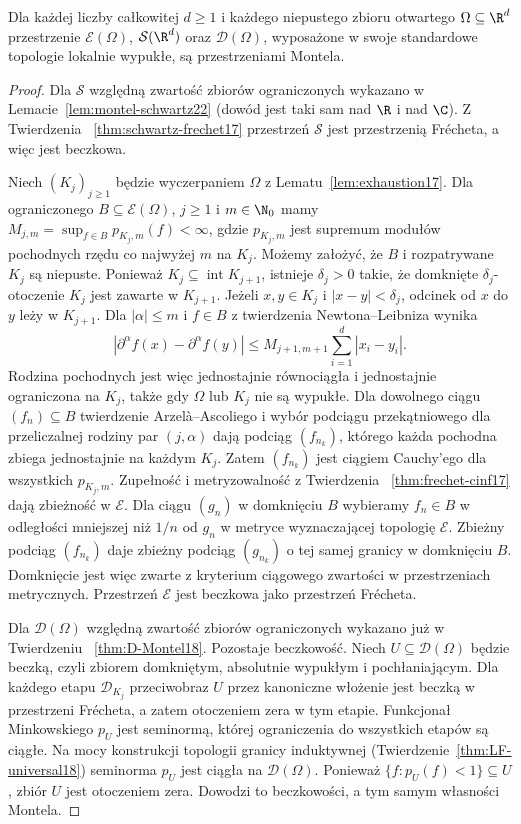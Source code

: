 \begin{twierdzenie}
\label{thm:montel-test23}
Dla każdej liczby całkowitej $d\ge1$ i każdego
niepustego zbioru otwartego $\Omega\subseteq\R^d$
przestrzenie $\mathcal E(\Omega)$,
$\mathcal S(\R^d)$ oraz $\mathcal D(\Omega)$, wyposażone
w swoje standardowe topologie lokalnie wypukłe, są przestrzeniami
Montela.
\end{twierdzenie}
\begin{proof}
Dla $\mathcal S$ względną zwartość zbiorów ograniczonych
wykazano w Lemacie~\ref{lem:montel-schwartz22} (dowód
jest taki sam nad $\R$ i nad $\C$). Z Twierdzenia~
\ref{thm:schwartz-frechet17} przestrzeń $\mathcal S$
jest przestrzenią Frécheta, a więc jest beczkowa.

Niech $(K_j)_{j\ge1}$ będzie wyczerpaniem $\Omega$
z Lematu~\ref{lem:exhaustion17}.
Dla ograniczonego $B\subseteq\mathcal E(\Omega)$,
$j\ge1$ i $m\in\N_0$ mamy
$M_{j,m}=\sup_{f\in B}p_{K_j,m}(f)<\infty$,
gdzie $p_{K_j,m}$ jest supremum modułów pochodnych
rzędu co najwyżej $m$ na $K_j$. Możemy założyć,
że $B$ i rozpatrywane $K_j$ są niepuste.
Ponieważ $K_j\subseteq\operatorname{int}K_{j+1}$,
istnieje $\delta_j>0$ takie, że domknięte
$\delta_j$-otoczenie $K_j$ jest zawarte w $K_{j+1}$.
Jeżeli $x,y\in K_j$ i $|x-y|<\delta_j$, odcinek
od $x$ do $y$ leży w $K_{j+1}$. Dla $|\alpha|\le m$
i $f\in B$ z twierdzenia Newtona--Leibniza wynika
\[
 |\partial^\alpha f(x)-\partial^\alpha f(y)|
 \le M_{j+1,m+1}\sum_{i=1}^d|x_i-y_i|.
\]
Rodzina pochodnych jest więc jednostajnie równociągła
i jednostajnie ograniczona na $K_j$, także gdy
$\Omega$ lub $K_j$ nie są wypukłe.
Dla dowolnego ciągu $(f_n)\subseteq B$ twierdzenie
Arzelà--Ascoliego i wybór podciągu przekątniowego
dla przeliczalnej rodziny par $(j,\alpha)$ dają
podciąg $(f_{n_k})$, którego każda pochodna zbiega
jednostajnie na każdym $K_j$. Zatem $(f_{n_k})$
jest ciągiem Cauchy'ego dla wszystkich $p_{K_j,m}$.
Zupełność i metryzowalność z Twierdzenia~
\ref{thm:frechet-cinf17} dają zbieżność w $\mathcal E$.
Dla ciągu $(g_n)$ w domknięciu $B$ wybieramy
$f_n\in B$ w odległości mniejszej niż $1/n$ od $g_n$
w metryce wyznaczającej topologię $\mathcal E$.
Zbieżny podciąg $(f_{n_k})$ daje zbieżny podciąg
$(g_{n_k})$ o tej samej granicy w domknięciu $B$.
Domknięcie jest więc zwarte z kryterium ciągowego
zwartości w przestrzeniach metrycznych.
Przestrzeń $\mathcal E$ jest beczkowa jako przestrzeń Frécheta.

Dla $\mathcal D(\Omega)$ względną zwartość zbiorów
ograniczonych wykazano już w Twierdzeniu~
\ref{thm:D-Montel18}. Pozostaje beczkowość.
Niech $U\subseteq\mathcal D(\Omega)$ będzie beczką,
czyli zbiorem domkniętym, absolutnie wypukłym i pochłaniającym.
Dla każdego etapu $\mathcal D_{K_j}$ przeciwobraz $U$
przez kanoniczne włożenie jest beczką w przestrzeni
Frécheta, a zatem otoczeniem zera w tym etapie.
Funkcjonał Minkowskiego $p_U$ jest seminormą, której
ograniczenia do wszystkich etapów są ciągłe.
Na mocy konstrukcji topologii granicy induktywnej
(Twierdzenie~\ref{thm:LF-universal18}) seminorma
$p_U$ jest ciągła na $\mathcal D(\Omega)$.
Ponieważ $\{f:p_U(f)<1\}\subseteq U$, zbiór $U$
jest otoczeniem zera. Dowodzi to beczkowości,
a tym samym własności Montela.
\end{proof}

